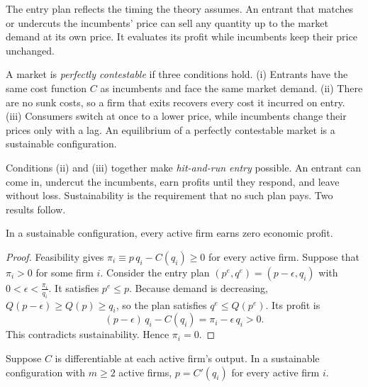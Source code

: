 The entry plan reflects the timing the theory assumes. An entrant that matches or undercuts the incumbents'
price can sell any quantity up to the market demand at its own price. It evaluates its profit while
incumbents keep their price unchanged.

\begin{definition}\label{def:09-contestable}
A market is \emph{perfectly contestable} if three conditions hold. (i) Entrants have the same cost function
$C$ as incumbents and face the same market demand. (ii) There are no sunk costs, so a firm that exits recovers
every cost it incurred on entry. (iii) Consumers switch at once to a lower price, while incumbents change
their prices only with a lag. An equilibrium of a perfectly contestable market is a sustainable configuration.
\end{definition}

Conditions (ii) and (iii) together make \emph{hit-and-run entry} possible. An entrant can come in, undercut
the incumbents, earn profits until they respond, and leave without loss. Sustainability is the requirement
that no such plan pays. Two results follow.

\begin{proposition}\label{prop:09-contest-zero}
In a sustainable configuration, every active firm earns zero economic profit.
\end{proposition}

\begin{proof}
Feasibility gives $\pi_i \equiv p\,q_i - C(q_i) \ge 0$ for every active firm. Suppose that $\pi_i > 0$ for
some firm $i$. Consider the entry plan $(p^e, q^e) = (p - \epsilon, q_i)$ with $0 < \epsilon < \frac{\pi_i}{q_i}$.
It satisfies $p^e \le p$. Because demand is decreasing, $Q(p - \epsilon) \ge Q(p) \ge q_i$, so the plan
satisfies $q^e \le Q(p^e)$. Its profit is
\begin{equation*}
  (p - \epsilon)\,q_i - C(q_i) = \pi_i - \epsilon\, q_i > 0.
\end{equation*}
This contradicts sustainability. Hence $\pi_i = 0$.
\end{proof}

\begin{proposition}\label{prop:09-contest-mc}
Suppose $C$ is differentiable at each active firm's output. In a sustainable configuration with $m \ge 2$
active firms, $p = C'(q_i)$ for every active firm $i$.
\end{proposition}

